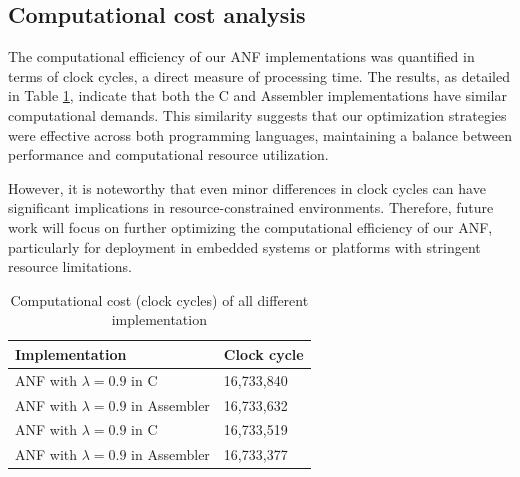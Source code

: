 \subsection{Computational cost analysis}
The computational efficiency of our ANF implementations was quantified in terms of clock cycles, a direct measure of processing time. The results, as detailed in Table \ref{tab:comp_cost}, indicate that both the C and Assembler implementations have similar computational demands. This similarity suggests that our optimization strategies were effective across both programming languages, maintaining a balance between performance and computational resource utilization. 

However, it is noteworthy that even minor differences in clock cycles can have significant implications in resource-constrained environments. Therefore, future work will focus on further optimizing the computational efficiency of our ANF, particularly for deployment in embedded systems or platforms with stringent resource limitations.


\begin{table}[ht]
\centering
\begin{tabular}{l|l}
\hline
Implementation                     & Clock cycle \\ \hline
ANF with $\lambda = 0.9$ in C         & 16,733,840  \\
ANF with $\lambda = 0.9$ in Assembler & 16,733,632  \\
ANF with $\lambda = 0.9$ in C         & 16,733,519  \\
ANF with $\lambda = 0.9$ in Assembler & 16,733,377 \\ \hline
\end{tabular}
\caption{Computational cost (clock cycles) of all different implementation}
\label{tab:comp_cost}
\end{table}

